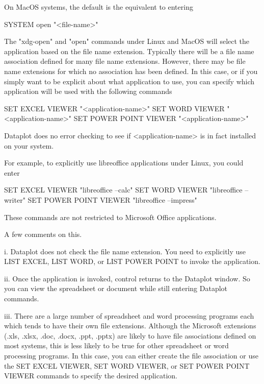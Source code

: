        On MacOS systems, the default is the equivalent to entering

             SYSTEM open "<file-name>"

       The "xdg-open" and "open" commands under Linux and MacOS
       will select the application based on the file name extension.
       Typically there will be a file name association defined for
       many file name extensions.  However, there may be file name
       extensions for which no association has been defined.  In this
       case, or if you simply want to be explicit about what application
       to use, you can specify which application will be used with the
       following commands

             SET EXCEL VIEWER        "<application-name>"
             SET WORD VIEWER         "<application-name>"
             SET POWER POINT VIEWER  "<application-name>"

       Dataplot does no error checking to see if <application-name>
       is in fact installed on your system.

       For example, to explicitly use libreoffice applications
       under Linux, you could enter

             SET EXCEL VIEWER       "libreoffice --calc"
             SET WORD  VIEWER       "libreoffice --writer"
             SET POWER POINT VIEWER "libreoffice --impress"

       These commands are not restricted to Microsoft Office
       applications.

       A few comments on this.

           i. Dataplot does not check the file name extension.
              You need to explicitly use LIST EXCEL, LIST WORD,
              or LIST POWER POINT to invoke the application.

          ii. Once the application is invoked, control returns
              to the Dataplot window.  So you can view the
              spreadsheet or document while still entering Dataplot
              commands.

         iii. There are a large number of spreadsheet and word
              processing programs each which tends to have their
              own file extensions.  Although the Microsoft extensions
              (.xls, .xlsx, .doc, .docx, .ppt, .pptx) are likely to
              have file associations defined on most systems, this is
              less likely to be true for other spreadsheet or word
              processing programs.  In this case, you can either
              create the file association or use the SET EXCEL VIEWER,
              SET WORD VIEWER, or SET POWER POINT VIEWER commands to
              specify the desired application.

